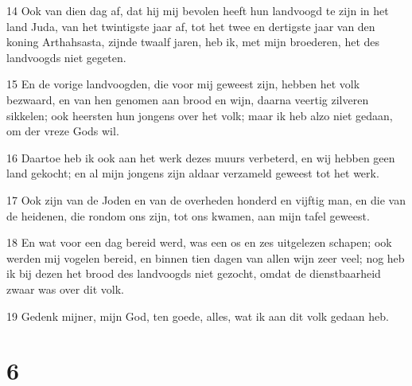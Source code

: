 \par 14 Ook van dien dag af, dat hij mij bevolen heeft hun landvoogd te zijn in het land Juda, van het twintigste jaar af, tot het twee en dertigste jaar van den koning Arthahsasta, zijnde twaalf jaren, heb ik, met mijn broederen, het des landvoogds niet gegeten.
\par 15 En de vorige landvoogden, die voor mij geweest zijn, hebben het volk bezwaard, en van hen genomen aan brood en wijn, daarna veertig zilveren sikkelen; ook heersten hun jongens over het volk; maar ik heb alzo niet gedaan, om der vreze Gods wil.
\par 16 Daartoe heb ik ook aan het werk dezes muurs verbeterd, en wij hebben geen land gekocht; en al mijn jongens zijn aldaar verzameld geweest tot het werk.
\par 17 Ook zijn van de Joden en van de overheden honderd en vijftig man, en die van de heidenen, die rondom ons zijn, tot ons kwamen, aan mijn tafel geweest.
\par 18 En wat voor een dag bereid werd, was een os en zes uitgelezen schapen; ook werden mij vogelen bereid, en binnen tien dagen van allen wijn zeer veel; nog heb ik bij dezen het brood des landvoogds niet gezocht, omdat de dienstbaarheid zwaar was over dit volk.
\par 19 Gedenk mijner, mijn God, ten goede, alles, wat ik aan dit volk gedaan heb.

\chapter{6}


